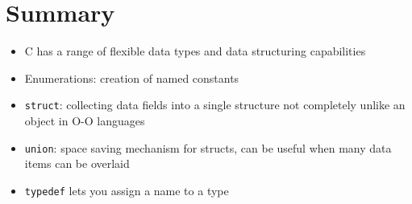 \documentclass{article}
\begin{document}
\section{Summary}
\begin{itemize}
\item C has a range of flexible data types and data structuring capabilities
\item Enumerations: creation of named constants 
\item \verb!struct!: collecting data fields into a single structure not completely unlike an object in O-O languages
\item \verb!union!: space saving mechanism for structs, can be useful when many data items can be overlaid
\item \verb!typedef! lets you assign a name to a type 
\end{itemize}
\end{document}
